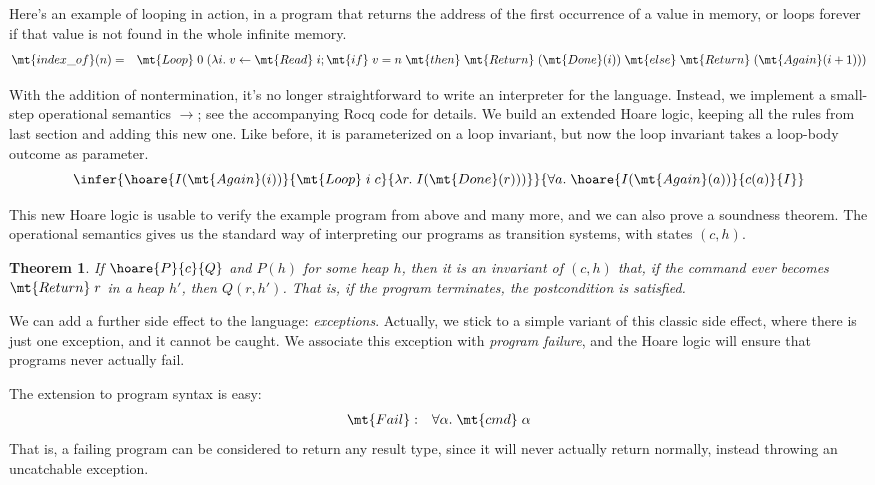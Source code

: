 \documentclass{amsbook}
\newtheorem{theorem}{Theorem}[chapter]
\theoremstyle{definition}
\theoremstyle{remark}
\numberwithin{section}{chapter}
\numberwithin{equation}{chapter}
\begin{document}
Here's an example of looping in action, in a program that returns the address of the first occurrence of a value in memory, or loops forever if that value is not found in the whole infinite memory.
\begin{eqnarray*}
  \mt{index\_of}(n) &=& \mt{Loop} \; 0 \; (\lambda i. \; v \leftarrow \mt{Read} \; i; \mt{if} \; v = n \; \mt{then} \; \mt{Return} \; (\mt{Done}(i)) \; \mt{else} \; \mt{Return} \; (\mt{Again}(i+1)))
\end{eqnarray*}

With the addition of nontermination, it's no longer straightforward to write an interpreter for the language.
Instead, we implement a small-step operational semantics $\to$; see the accompanying Rocq code for details.
We build an extended Hoare logic, keeping all the rules from last section and adding this new one.
\invariants
Like before, it is parameterized on a loop invariant, but now the loop invariant takes a loop-body outcome as parameter.
$$\infer{\hoare{I(\mt{Again}(i))}{\mt{Loop} \; i \; c}{\lambda r. \; I(\mt{Done}(r)))}}{
  \forall a. \; \hoare{I(\mt{Again}(a))}{c(a)}{I}
}$$

This new Hoare logic is usable to verify the example program from above and many more, and we can also prove a soundness theorem.
The operational semantics gives us the standard way of interpreting our programs as transition systems, with states $(c, h)$.

\invariants
\begin{theorem}
  If $\hoare{P}{c}{Q}$ and $P(h)$ for some heap $h$, then it is an invariant of $(c, h)$ that, if the command ever becomes $\mt{Return} \; r$ in a heap $h'$, then $Q(r, h')$.  That is, if the program terminates, the postcondition is satisfied.
\end{theorem}

We can add a further side effect to the language: \emph{exceptions}.
Actually, we stick to a simple variant of this classic side effect, where there is just one exception, and it cannot be caught.
We associate this exception with \emph{program failure}, and the Hoare logic will ensure that programs never actually fail.

The extension to program syntax is easy:
\begin{eqnarray*}
  \mt{Fail} &:& \forall \alpha. \; \mt{cmd} \; \alpha
\end{eqnarray*}
That is, a failing program can be considered to return any result type, since it will never actually return normally, instead throwing an uncatchable exception.
\end{document}
